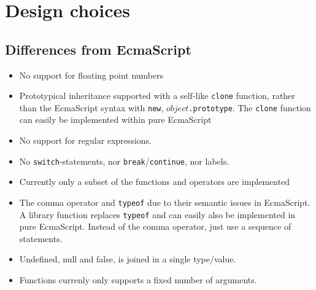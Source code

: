 \documentclass[11pt]{report}
\begin{document}
\section{Design choices}
\subsection{Differences from EcmaScript}
\begin{itemize}
\item No support for floating point numbers
\item Prototypical inheritance supported with a self-like \verb|clone| function, rather than the EcmaScript syntax with \verb|new|, $object$\verb|.prototype|. The \verb|clone| function can easily be implemented within pure EcmaScript
\item No support for regular expressions. 
\item No \verb|switch|-statements, nor \verb|break|/\verb|continue|, nor labels. 
\item Currently only a subset of the functions and operators are implemented
\item The comma operator and \verb|typeof| due to their semantic issues in EcmaScript. A library function replaces \verb|typeof| and can easily also be implemented in pure EcmaScript. Instead of the comma operator, just use a sequence of statements.
\item Undefined, null and false, is joined in a single type/value.
\item Functions currenly only supports a fixed number of arguments.
\end{itemize}
\end{document}
